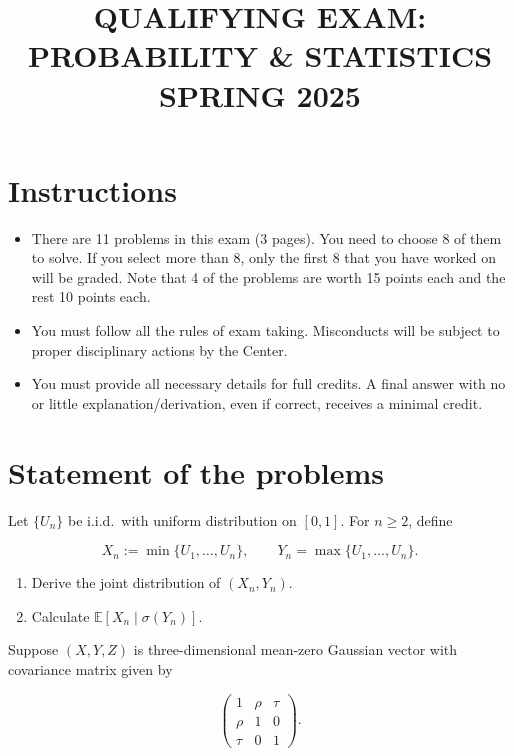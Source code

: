 \documentclass[11pt,a4paper]{article}
\title{\textbf{QUALIFYING EXAM: PROBABILITY \& STATISTICS}\\[0.5em]\Large SPRING 2025}
\date{}
\author{}
\newcommand{\examstatement}[1]{%
  \par\addvspace{0.85em}%
  \noindent{\bfseries #1}\par\nobreak\addvspace{0.28em}%
}
\begin{document}
\maketitle
\vspace{-3em}

\tableofcontents

\section{Instructions}
\begin{itemize}
    \item There are 11 problems in this exam (3 pages). You need to choose 8 of them to solve. If you select more than 8, only the first 8 that you have worked on will be graded. Note that 4 of the problems are worth 15 points each and the rest 10 points each.
    \item You must follow all the rules of exam taking. Misconducts will be subject to proper disciplinary actions by the Center.
    \item You must provide all necessary details for full credits. A final answer with no or little explanation/derivation, even if correct, receives a minimal credit.
\end{itemize}

\section{Statement of the problems}

\examstatement{Problem 1. [10 pts.]}
Let \( \{U_n\} \) be i.i.d.\ with uniform distribution on \( [0, 1] \). For \( n \ge 2 \), define

\[
X_n := \min\{U_1, \dots, U_n\}, \qquad Y_n = \max\{U_1, \dots, U_n\}.
\]

\begin{enumerate}[label=(\arabic*)]
    \item Derive the joint distribution of \( (X_n, Y_n) \).
    \item Calculate \( \mathbb{E}[X_n \mid \sigma(Y_n)] \).
\end{enumerate}

\examstatement{Problem 2. [10 pts.]}
Suppose \( (X, Y, Z) \) is three-dimensional mean-zero Gaussian vector with covariance matrix given by

\[
\begin{pmatrix}
1 & \rho & \tau \\
\rho & 1 & 0 \\
\tau & 0 & 1
\end{pmatrix}.
\]
\end{document}
